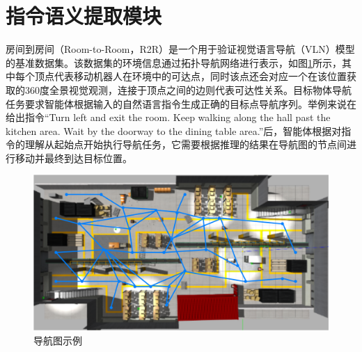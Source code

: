 \section{指令语义提取模块}
房间到房间（Room-to-Room，R2R）是一个用于验证视觉语言导航（VLN）模型的基准数据集\cite{anderson2018vision}。该数据集的环境信息通过拓扑导航网络进行表示，如图\ref{r2r_nav}所示，其中每个顶点代表移动机器人在环境中的可达点，同时该点还会对应一个在该位置获取的360度全景视觉观测，连接于顶点之间的边则代表可达性关系。目标物体导航任务要求智能体根据输入的自然语言指令生成正确的目标点导航序列。举例来说在给出指令“Turn left and exit the room. Keep walking along the hall past the kitchen area. Wait by the doorway to the dining table area.”后，智能体根据对指令的理解从起始点开始执行导航任务，它需要根据推理的结果在导航图的节点间进行移动并最终到达目标位置。
\begin{figure}[htbp]
    \centering
    \includegraphics[scale=0.35]{Fig/导航图示例.png}
    \caption{\label{r2r_nav}导航图示例}
\end{figure}


